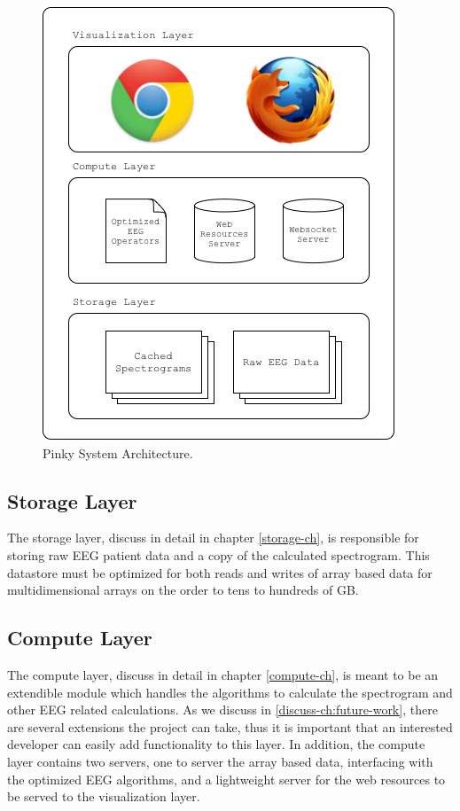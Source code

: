 \begin{figure}[h]
\begin{center}
\includegraphics[scale=0.75]{./img/system-architecture.png}
\caption{Pinky System Architecture.}
\label{fig:system-architecture}
\end{center}
\end{figure}

\subsection{Storage Layer}

The storage layer, discuss in detail in chapter \ref{storage-ch}, is responsible for
storing raw EEG patient data and a copy of the calculated spectrogram. This
datastore must be optimized for both reads and writes of array based data for
multidimensional arrays on the order to tens to hundreds of GB.

\subsection{Compute Layer}

The compute layer, discuss in detail in chapter \ref{compute-ch}, is meant to be an
extendible module which handles the algorithms to calculate the spectrogram and
other EEG related calculations. As we discuss in \ref{discuss-ch:future-work},
there are several extensions the project can take, thus it is important that an
interested developer can easily add functionality to this layer. In addition,
the compute layer contains two servers, one to server the array based data,
interfacing with the optimized EEG algorithms, and a lightweight server for the
web resources to be served to the visualization layer.

